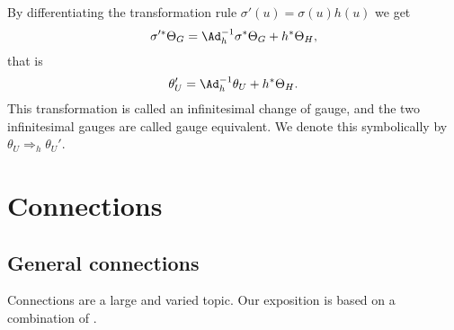 By differentiating the transformation rule $\sigma'(u)=\sigma(u)h(u)$ we get
\[\sigma^{\prime\ast}\Theta_G=\Ad_h^{-1}\sigma^\ast\Theta_G+h^\ast\Theta_H,\]
that is
\[\theta_U'=\Ad_h^{-1}\theta_U+h^\ast\Theta_H.\]
This transformation is called an infinitesimal change of gauge, and the two infinitesimal gauges are called gauge equivalent. We denote this symbolically by $\theta_U\Rightarrow_h \theta_U'$.









\newpage
\section{Connections}

\subsection{General connections}\label{sec general connections}

Connections are a large and varied topic. Our exposition is based on a combination of \cite{Vakar,RS2,Kolar}.


